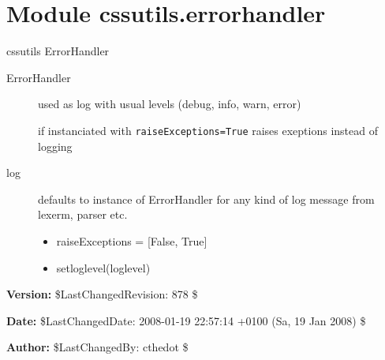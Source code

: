 %
%
%


\section{Module cssutils.errorhandler}

    \label{cssutils:errorhandler}

cssutils ErrorHandler
\begin{description}
\item[{ErrorHandler}] \leavevmode 
used as log with usual levels (debug, info, warn, error)

if instanciated with \texttt{raiseExceptions=True} raises exeptions instead
of logging

\item[{log}] \leavevmode 
defaults to instance of ErrorHandler for any kind of log message from
lexerm, parser etc.
\begin{itemize}
\item {} 
raiseExceptions = {[}False, True{]}

\item {} 
setloglevel(loglevel)

\end{itemize}

\end{description}
\textbf{Version:} \$LastChangedRevision: 878 \$



\textbf{Date:} \$LastChangedDate: 2008-01-19 22:57:14 +0100 (Sa, 19 Jan 2008) \$



\textbf{Author:} \$LastChangedBy: cthedot \$





